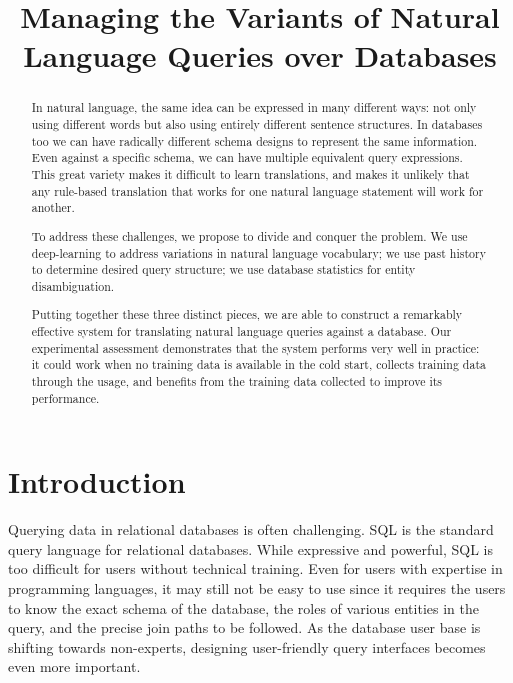 \documentclass{vldb}
\begin{document}
\title{Managing the Variants of Natural Language Queries over Databases}

\maketitle

\begin{abstract}

In natural language, the same idea can be expressed in many different ways: not only using different words but also using entirely different sentence structures.  In databases too we can have radically different schema designs to represent the same information.  Even against a specific schema, we can have multiple equivalent query expressions.  This great variety makes it difficult to learn translations, and makes it unlikely that any rule-based translation that works for one natural language statement will work for another.

To address these challenges, we propose to divide and conquer the problem.  We use deep-learning to address variations in natural language vocabulary; we use past history to determine desired query structure; we use database statistics for entity disambiguation.

Putting together these three distinct pieces, we are able to construct a remarkably effective system for translating natural language queries against a database.  Our experimental assessment demonstrates that the system performs very well in practice: it could work when no training data is available in the cold start, collects training data through the usage, and benefits from the training data collected to improve its performance.
\end{abstract}

\section{Introduction}
\label{sec:introduction}

Querying data in relational databases is often challenging.  SQL is the standard query language for relational databases.  While expressive and powerful, SQL is too difficult for users without technical training.  Even for users with expertise in programming languages, it may still not be easy to use since it requires the users to know the exact schema of the database, the roles of various entities in the query, and the precise join paths to be followed.   As the database user base is shifting towards non-experts, designing user-friendly query interfaces becomes even more important.   
\end{document}
